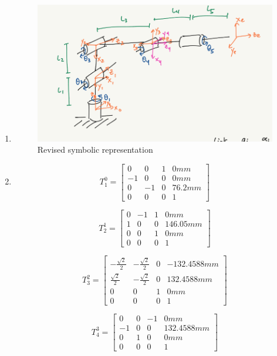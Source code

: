 \documentclass[12pt]{article}
\begin{document}
\begin{enumerate}
\item \begin{figure}
	\centering 
	\includegraphics[scale=1]{Q1.png}
	\caption{Revised symbolic representation}
	\end{figure}
\item 
\begin{equation}
	T^{0}_{1} = \begin{bmatrix}
	0 & 0 & 1 & 0mm\\
	-1 & 0 & 0 & 0mm\\
	0 & -1 & 0 & 76.2mm\\
	0 & 0 & 0 & 1
	\end{bmatrix}
\end{equation}

\begin{equation}	
	T^{1}_{2} = \begin{bmatrix}
	0 & -1 & 1 & 0mm\\
	1 & 0 & 0 & 146.05mm\\
	0 & 0 & 1 & 0mm\\
	0 & 0 & 0 & 1
	\end{bmatrix}
\end{equation}

\begin{equation}	
	T^{2}_{3} = \begin{bmatrix}
	-\frac{\sqrt{2}}{2} & -\frac{\sqrt{2}}{2} & 0 & -132.4588mm\\
	\frac{\sqrt{2}}{2} & -\frac{\sqrt{2}}{2} & 0 & 132.4588mm\\
	0 & 0 & 1 & 0mm\\
	0 & 0 & 0 & 1
	\end{bmatrix}
\end{equation}

\begin{equation}	
	T^{3}_{4} = \begin{bmatrix}
	0 & 0 & -1 & 0mm\\
	-1 & 0 & 0 & 132.4588mm\\
	0 & 1 & 0 & 0mm\\
	0 & 0 & 0 & 1
	\end{bmatrix}
\end{equation}


\end{enumerate}
\end{document}
